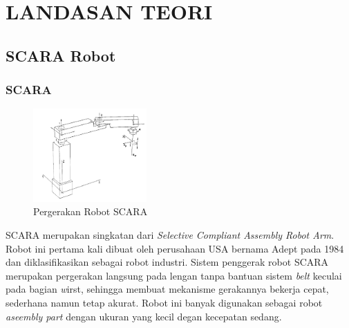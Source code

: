 \chapter{LANDASAN TEORI}

\section{SCARA Robot}
 \subsection{SCARA}
\begin{figure}[H]
	\centering
	\includegraphics[width=4.33cm]{gambar/scara.png}
	\caption{Pergerakan Robot SCARA}
\end{figure}

SCARA merupakan singkatan dari \emph{Selective Compliant Assembly Robot Arm}. Robot ini pertama kali dibuat oleh perusahaan USA bernama Adept pada 1984 dan diklasifikasikan sebagai robot industri. Sistem penggerak robot SCARA merupakan pergerakan langsung pada lengan tanpa bantuan sistem \emph{belt} keculai pada bagian \emph wirst, sehingga membuat mekanisme gerakannya bekerja cepat, sederhana namun tetap akurat. Robot ini banyak digunakan sebagai robot \emph {aseembly part} dengan ukuran yang kecil degan kecepatan sedang. 

